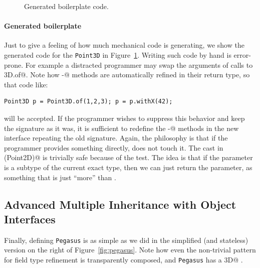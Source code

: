 


\begin{figure}
\saveSpaceFig
\caption{Generated boilerplate code.}
\label{fig:boilerplate}
\end{figure}

\paragraph{Generated boilerplate}
Just to give a feeling of how much mechanical code \mixin is generating, we show the
generated code for the \texttt{Point3D} in Figure~\ref{fig:boilerplate}. Writing such code by hand is error-prone. For
example a distracted programmer may swap the arguments of calls to
\Q@Point3D.of@.  Note how \Q@with-@ methods are automatically refined in their
return type, so that code like:

\begin{lstlisting}
Point3D p = Point3D.of(1,2,3); p = p.withX(42);
\end{lstlisting}

\noindent will be accepted. If the programmer wishes to suppress this behavior
and keep the signature as it was, it is sufficient to redefine the \Q@with-@
methods in the new interface repeating the old signature.  Again, the philosophy
is that if the programmer provides something directly, \mixin does not touch it.
The cast in \Q@with(Point2D)@ is trivially safe because of the \Q@instanceof@
test. The idea is that if the parameter is a subtype of the current exact type,
then we can just return the parameter, as something that is just ``more'' than
\Q@this@.

\subsection{Advanced Multiple Inheritance with Object Interfaces}
Finally, defining \texttt{Pegasus} is as simple as we did in the simplified
(and stateless) version on the right of Figure~\ref{fig:pegasus}.
 Note how even the non-trivial pattern for field type refinement is
transparently composed, and \texttt{Pegasus} has a \Q@Point3D@
\Q@location@.%

